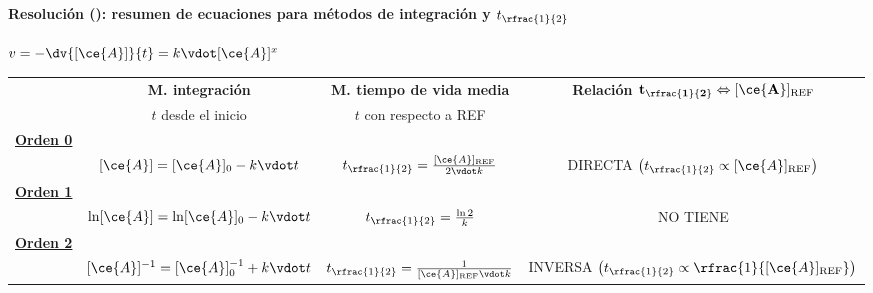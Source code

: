 
\newcommand{\tmedio}{t_{\rfrac{1}{2}}}

\begin{frame}
	\frametitle{\ejerciciocmd}
	\framesubtitle{Resolución (): resumen de ecuaciones para métodos de integración y $\tmedio$}
	\begin{center}
	\end{center}
	 $v = -\dv{[\ce{A}]}{t} = k\vdot[\ce{A}]^x$
	\begin{center}
		\begin{tabular}{lccc}
						&	\textbf{M. integración}		&	\textbf{M. tiempo de vida media}		&	\textbf{Relación $\mathbf{\tmedio\Leftrightarrow[\ce{A}]_{\text{REF}}}$}	\\
						&	$t$ desde el inicio			&	$t$ con respecto a REF					&																					\\
			\midrule
			\underline{\textbf{\color{blue}Orden 0}}												\\
						&	$[\ce{A}] = [\ce{A}]_0 - k\vdot t$										&
							$\tmedio  = \frac{[\ce{A}]_{\text{REF}}}{2\vdot k}$						&
							DIRECTA	$\left(\tmedio\propto[\ce{A}]_{\text{REF}}\right)$				\\[.3cm]
			\midrule
			\underline{\textbf{\color{blue}Orden 1}}												\\
						&	$\ln[\ce{A}] = \ln[\ce{A}]_0 - k\vdot t$								&
							$\tmedio = \frac{\ln 2}{k}$												&
							NO TIENE																\\[.3cm]
			\midrule
			\underline{\textbf{\color{blue}Orden 2}}												\\
						&	$[\ce{A}]^{-1} = [\ce{A}]^{-1}_0 + k\vdot t$							&
						$\tmedio = \frac{1}{[\ce{A}]_{\text{REF}}\vdot k}$							&
						INVERSA $\left(\tmedio\propto\rfrac{1}{[\ce{A}]_{\text{REF}}}\right)$
		\end{tabular}
	\end{center}
\end{frame}

